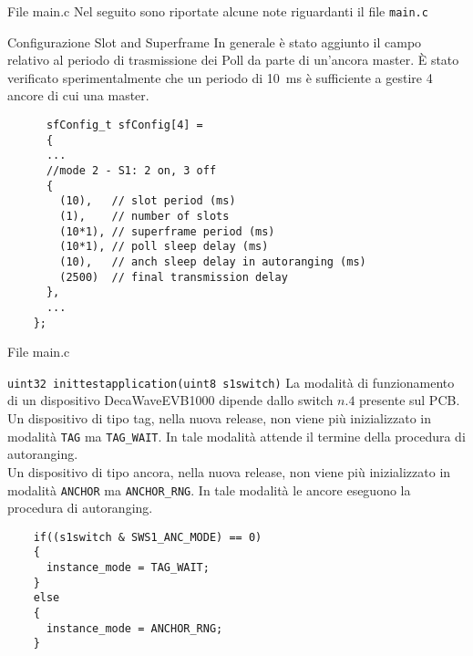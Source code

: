 \begin{frame}[fragile, shrink=15]{File main.c}
  Nel seguito sono riportate alcune note riguardanti il file \lstinline!main.c!
  \begin{block}{Configurazione Slot and Superframe}
    In generale è stato aggiunto il campo relativo al periodo di trasmissione dei Poll
    da parte di un'ancora master. È stato verificato sperimentalmente che un periodo di \SI{10}{\milli\second} è
    sufficiente a gestire 4 ancore di cui una master.\\
    \begin{lstlisting}
      sfConfig_t sfConfig[4] =
      {
      ...
      //mode 2 - S1: 2 on, 3 off
      {
        (10),   // slot period (ms)
        (1),    // number of slots
        (10*1), // superframe period (ms)
        (10*1), // poll sleep delay (ms)
        (10),   // anch sleep delay in autoranging (ms)
        (2500)  // final transmission delay
      },
      ...
    };
  \end{lstlisting}
  \end{block}
\end{frame}

\begin{frame}[fragile, shrink=15]{File main.c}
  \begin{block}{\lstinline!uint32 inittestapplication(uint8 s1switch)!}
    La modalità di funzionamento di un dispositivo DecaWaveEVB1000 dipende
    dallo switch $n.4$ presente sul PCB.\\
    Un dispositivo di tipo tag, nella nuova release, non viene più inizializzato in modalità
    \lstinline!TAG! ma \lstinline!TAG_WAIT!. In tale modalità attende il termine della procedura
    di autoranging.\\
    Un dispositivo di tipo ancora, nella nuova release, non viene più inizializzato in modalità
    \lstinline!ANCHOR! ma \lstinline!ANCHOR_RNG!. In tale modalità le ancore eseguono la procedura
    di autoranging.
    \begin{lstlisting}
    if((s1switch & SWS1_ANC_MODE) == 0)
    {
      instance_mode = TAG_WAIT;
    }
    else
    {
      instance_mode = ANCHOR_RNG;
    }
    \end{lstlisting}
  \end{block}
\end{frame}

